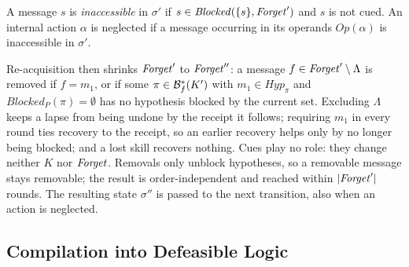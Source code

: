 A message $s$ is \emph{inaccessible} in $\sigma'$ if $s\in\mathit{Blocked}(\{s\},\mathit{Forget}')$ and $s$ is not cued. An internal action $\alpha$ is neglected if a message occurring in its operands $\mathit{Op}(\alpha)$ is inaccessible in $\sigma'$. 

Re-acquisition then shrinks $\mathit{Forget}'$ to $\mathit{Forget}''$: a message $f\in\mathit{Forget}'\setminus\Lambda$ is removed if $f=m_1$, or if some $\pi\in\mathcal{B}^*_f(K')$ with $m_1\in\mathit{Hyp}_\pi$ and $\mathit{Blocked}_P(\pi)=\emptyset$ has no hypothesis blocked by the current set. Excluding $\Lambda$ keeps a lapse from being undone by the receipt it follows; requiring $m_1$ in every round ties recovery to the receipt, so an earlier recovery helps only by no longer being blocked; and a lost skill recovers nothing. Cues play no role: they change neither $K$ nor $\mathit{Forget}$. Removals only unblock hypotheses, so a removable message stays removable; the result is order-independent and reached within $|\mathit{Forget}'|$ rounds. The resulting state $\sigma''$ is passed to the next transition, also when an action is neglected. 

\subsection{Compilation into Defeasible Logic}

